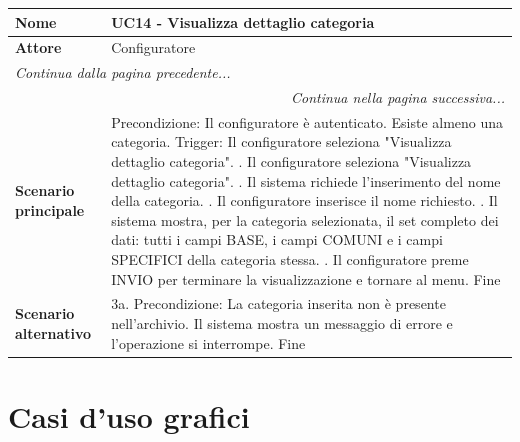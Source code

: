\documentclass[12pt, a4paper, oneside]{report}
\begin{document}
\renewcommand{\arraystretch}{1.4} 

\begin{tabularx}{\textwidth}{|l|X|}
    \hline
    \textbf{Nome}               & \textbf{UC14 - Visualizza dettaglio categoria} \\ \hline
    \textbf{Attore}             & Configuratore \\ \hline
    \endfirsthead 

    \hline
    \multicolumn{2}{|l|}{\textit{Continua dalla pagina precedente...}} \\ \hline
    \endhead 

    \hline
    \multicolumn{2}{|r|}{\textit{Continua nella pagina successiva...}} \\ \hline
    \endfoot 

    \hline
    \endlastfoot

    \textbf{Scenario principale} & 
    Precondizione: Il configuratore è autenticato. Esiste almeno una categoria. \newline
    Trigger: Il configuratore seleziona "Visualizza dettaglio categoria". \newline
    1. Il configuratore seleziona "Visualizza dettaglio categoria". \newline
    2. Il sistema richiede l'inserimento del nome della categoria. \newline
    3. Il configuratore inserisce il nome richiesto. \newline
    4. Il sistema mostra, per la categoria selezionata, il set completo dei dati: tutti i campi BASE, i campi COMUNI e i campi SPECIFICI della categoria stessa. \newline
    5. Il configuratore preme INVIO per terminare la visualizzazione e tornare al menu. \newline
    Fine \\ \hline
    
    \textbf{Scenario alternativo} & 
    3a. Precondizione: La categoria inserita non è presente nell'archivio. \newline
    Il sistema mostra un messaggio di errore e l'operazione si interrompe. \newline
    Fine \\ \hline
\end{tabularx}


\section{Casi d'uso grafici}
\end{document}
